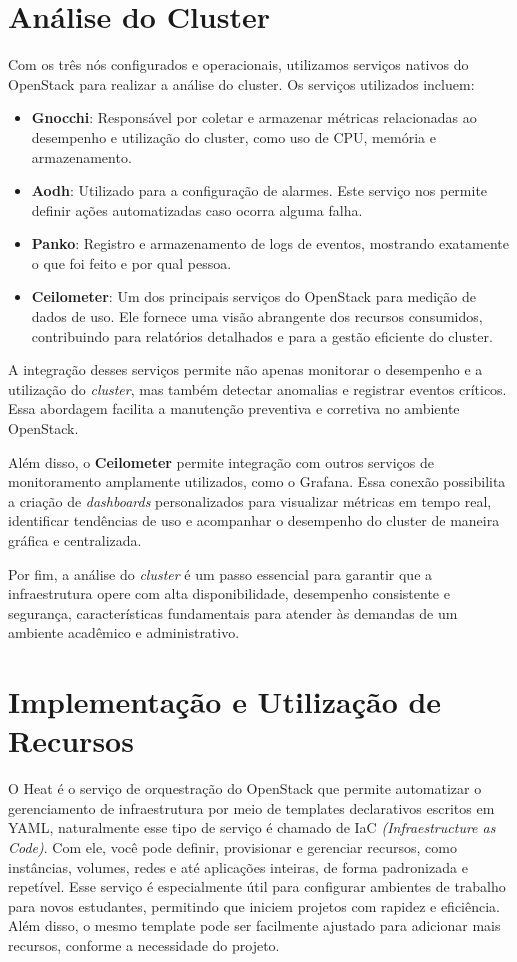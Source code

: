 \section{Análise do Cluster}

Com os três nós configurados e operacionais, utilizamos serviços nativos do OpenStack para realizar a análise do cluster. Os serviços utilizados incluem:

\begin{itemize}
    \item \textbf{Gnocchi}: Responsável por coletar e armazenar métricas relacionadas ao desempenho e utilização do cluster, como uso de CPU, memória e armazenamento.
    \item \textbf{Aodh}: Utilizado para a configuração de alarmes. Este serviço nos permite definir ações automatizadas caso ocorra alguma falha.
    \item \textbf{Panko}: Registro e armazenamento de logs de eventos, mostrando exatamente o que foi feito e por qual pessoa.
    \item \textbf{Ceilometer}: Um dos principais serviços do OpenStack para medição de dados de uso. Ele fornece uma visão abrangente dos recursos consumidos, contribuindo para relatórios detalhados e para a gestão eficiente do cluster.
\end{itemize}

A integração desses serviços permite não apenas monitorar o desempenho e a utilização do \textit{cluster}, mas também detectar anomalias e registrar eventos críticos. Essa abordagem facilita a manutenção preventiva e corretiva no ambiente OpenStack.

Além disso, o \textbf{Ceilometer} permite integração com outros serviços de monitoramento amplamente utilizados, como o Grafana. Essa conexão possibilita a criação de \textit{dashboards} personalizados para visualizar métricas em tempo real, identificar tendências de uso e acompanhar o desempenho do cluster de maneira gráfica e centralizada. 

Por fim, a análise do \textit{cluster} é um passo essencial para garantir que a infraestrutura opere com alta disponibilidade, desempenho consistente e segurança, características fundamentais para atender às demandas de um ambiente acadêmico e administrativo.

\section{Implementação e Utilização de Recursos}
O Heat é o serviço de orquestração do OpenStack que permite automatizar o gerenciamento de infraestrutura por meio de templates declarativos escritos em YAML, naturalmente esse tipo de serviço é chamado de IaC  \textit{(Infraestructure as Code)}. Com ele, você pode definir, provisionar e gerenciar recursos, como instâncias, volumes, redes e até aplicações inteiras, de forma padronizada e repetível. Esse serviço é especialmente útil para configurar ambientes de trabalho para novos estudantes, permitindo que iniciem projetos com rapidez e eficiência. Além disso, o mesmo template pode ser facilmente ajustado para adicionar mais recursos, conforme a necessidade do projeto.

